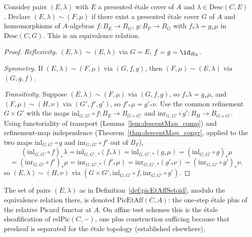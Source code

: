 \begin{definition}
  \label{def:picEtAffSetoid}
  \leanok
  Consider pairs \((E,\lambda)\) with \(E\) a presented \'etale cover of \(A\) and
  \(\lambda \in \mathrm{Desc}(C,E)\). Declare \((E,\lambda) \sim (F,\mu)\) if there exist a
  presented \'etale cover \(G\) of \(A\) and homomorphisms of \(A\)-algebras
  \(f \colon B_E \to B_G\), \(g \colon B_F \to B_G\) with \(f_{*}\lambda = g_{*}\mu\) in
  \(\mathrm{Desc}(C,G)\). This is an equivalence relation.
\end{definition}
\begin{proof}
  \leanok
  \emph{Reflexivity.} \((E,\lambda) \sim (E,\lambda)\) via \(G = E\), \(f = g = \id_{B_E}\).

  \emph{Symmetry.} If \((E,\lambda) \sim (F,\mu)\) via \((G,f,g)\), then \((F,\mu) \sim
  (E,\lambda)\) via \((G,g,f)\).

  \emph{Transitivity.} Suppose \((E,\lambda) \sim (F,\mu)\) via \((G,f,g)\), so \(f_{*}\lambda =
  g_{*}\mu\), and \((F,\mu) \sim (H,\nu)\) via \((G',f',g')\), so \(f'_{*}\mu = g'_{*}\nu\). Use
  the common refinement \(G \times G'\) with the maps \(\mathrm{inl}_{G,G'} \circ f \colon B_E
  \to B_{G \times G'}\) and \(\mathrm{inr}_{G,G'} \circ g' \colon B_H \to B_{G \times G'}\).
  Using functoriality of transport (Lemma~\ref{lem:descentMap_comp}) and refinement-map
  independence (Theorem~\ref{thm:descentMap_congr}, applied to the two maps
  \(\mathrm{inl}_{G,G'} \circ g\) and \(\mathrm{inr}_{G,G'} \circ f'\) out of \(B_F\)),
  \[
    (\mathrm{inl}_{G,G'} \circ f)_{*}\lambda = \mathrm{inl}_{G,G',*}(f_{*}\lambda) =
    \mathrm{inl}_{G,G',*}(g_{*}\mu) = (\mathrm{inl}_{G,G'} \circ g)_{*}\mu
  \]
  \[
    = (\mathrm{inr}_{G,G'} \circ f')_{*}\mu = \mathrm{inr}_{G,G',*}(f'_{*}\mu) =
    \mathrm{inr}_{G,G',*}(g'_{*}\nu) = (\mathrm{inr}_{G,G'} \circ g')_{*}\nu,
  \]
  so \((E,\lambda) \sim (H,\nu)\) via \((G \times G', \mathrm{inl}_{G,G'} \circ f,
  \mathrm{inr}_{G,G'} \circ g')\).
\end{proof}

\begin{definition}
  \label{def:PicEtAff}
  \leanok
  The set of pairs \((E,\lambda)\) as in Definition~\ref{def:picEtAffSetoid}, modulo the
  equivalence relation there, is denoted \(\mathrm{PicEtAff}(C,A)\): the one-step \'etale plus
  of the relative Picard functor at \(A\). On affine test schemes this is the \'etale
  sheafification of \(\mathrm{relPic}(C,-)\), one plus construction sufficing because that
  presheaf is separated for the \'etale topology (established elsewhere).
\end{definition}

